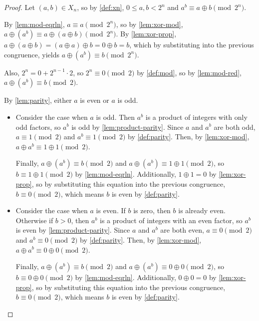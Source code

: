 \documentclass[1gpt]{article}
\theoremstyle{break}
\newcommand{\xor}{\oplus}
\begin{document}
\begin{proof}

    Let $(a, b) \in X_n$, so by \ref{def:xn}, $0 \leq a, b < 2^n$ and $a^b
    \equiv a \xor b \pmod{2^n}$.

    By \ref{lem:mod-eqrln}, $a \equiv a \pmod{2^n}$, so by \ref{lem:xor-mod},
    $a \xor (a^b) \equiv a \xor (a \xor b) \pmod{2^n}$. By \ref{lem:xor-prop},
    $a \xor (a \xor b) = (a \xor a) \xor b = 0 \xor b = b$, which by
    substituting into the previous congruence, yields $a \xor (a^b) \equiv b
    \pmod{2^n}$.

    Also, $2^n = 0 + 2^{n-1} \cdot 2$, so $2^n \equiv 0 \pmod{2}$ by
    \ref{def:mod}, so by \ref{lem:mod-red}, $a \xor (a^b) \equiv b \pmod{2}$.

    By \ref{lem:parity}, either $a$ is even or $a$ is odd.

    \begin{itemize}

        \item

            Consider the case when $a$ is odd. Then $a^b$ is a product of
            integers with only odd factors, so $a^b$ is odd by
            \ref{lem:product-parity}. Since $a$ and $a^b$ are both odd, $a
            \equiv 1 \pmod{2}$ and $a^b \equiv 1 \pmod{2}$ by \ref{def:parity}.
            Then, by \ref{lem:xor-mod}, $a \xor a^b \equiv 1 \xor 1 \pmod{2}$.

            Finally, $a \xor (a^b) \equiv b \pmod{2}$ and $a \xor (a^b) \equiv
            1 \xor 1 \pmod{2}$, so $b \equiv 1 \xor 1 \pmod{2}$ by
            \ref{lem:mod-eqrln}. Additionally, $1 \xor 1 = 0$ by
            \ref{lem:xor-prop}, so by substituting this equation into the
            previous congruence, $b \equiv 0 \pmod{2}$, which means $b$ is even
            by \ref{def:parity}.

        \item

            Consider the case when $a$ is even. If $b$ is zero, then $b$ is
            already even. Otherwise if $b > 0$, then $a^b$ is a product of
            integers with an even factor, so $a^b$ is even by
            \ref{lem:product-parity}. Since $a$ and $a^b$ are both even, $a
            \equiv 0 \pmod{2}$ and $a^b \equiv 0 \pmod{2}$ by \ref{def:parity}.
            Then, by \ref{lem:xor-mod}, $a \xor a^b \equiv 0 \xor 0 \pmod{2}$.

            Finally, $a \xor (a^b) \equiv b \pmod{2}$ and $a \xor (a^b) \equiv
            0 \xor 0 \pmod{2}$, so $b \equiv 0 \xor 0 \pmod{2}$ by
            \ref{lem:mod-eqrln}. Additionally, $0 \xor 0 = 0$ by
            \ref{lem:xor-prop}, so by substituting this equation into the
            previous congruence, $b \equiv 0 \pmod{2}$, which means $b$ is even
            by \ref{def:parity}.

    \end{itemize}

    \hfill\proofSymbol

\end{proof}
\end{document}
